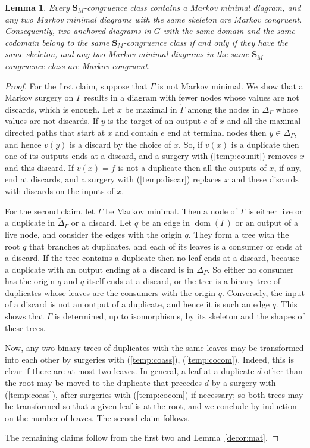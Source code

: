 \documentclass[12pt]{amsart}
\theoremstyle{plain}
\newtheorem{lem}[thm]{Lemma}
\theoremstyle{definition}
\theoremstyle{remark}
\numberwithin{equation}{section}
\theoremstyle{plain}
\DeclareMathOperator{\dom}{dom}
\newcommand{\0}{\emptyset}
\begin{document}
\begin{lem}\label{mar:min:com}
Every $\bm S_M$-congruence class contains a Markov minimal diagram, and any two Markov minimal diagrams with the same skeleton are Markov congruent. Consequently, two anchored diagrams in $G$ with the same domain and the same codomain belong to the same $\bm S_M$-congruence class if and only if they have the same skeleton, and any two Markov minimal diagrams in the same $\bm S_M$-congruence class are Markov congruent.
\end{lem}
\begin{proof}
For the first claim, suppose that $\Gamma$ is not Markov minimal. We show that a Markov surgery on $\Gamma$ results in a diagram with fewer nodes whose values are not discards, which is enough. Let $x$ be maximal in $\dot \Gamma$ among the nodes in $\Delta_\Gamma$ whose values are not discards. If $y$ is the target of an output $e$ of $x$ and all the maximal directed paths that start at $x$ and contain $e$ end at terminal nodes then $y \in \Delta_\Gamma$, and hence $v(y)$ is a discard by the choice of $x$. So, if $v(x)$ is a duplicate then one of its outputs ends at a discard, and a surgery with (\ref{temp:counit}) removes $x$ and this discard. If $v(x) = f$ is not a duplicate then all the outputs of $x$, if any, end at discards, and a surgery with (\ref{temp:discar}) replaces $x$ and these discards with discards on the inputs of $x$.

For the second claim, let $\Gamma$ be Markov minimal. Then a node of $\Gamma$ is either live or a duplicate in $\tilde \Delta_\Gamma$ or a discard. Let $q$ be an edge in $\dom(\Gamma)$ or an output of a live node, and consider the edges with the origin $q$. They form a tree with the root $q$ that branches at duplicates, and each of its leaves is a consumer or ends at a discard. If the tree contains a duplicate then no leaf ends at a discard, because a duplicate with an output ending at a discard is in $\Delta_\Gamma$. So either no consumer has the origin $q$ and $q$ itself ends at a discard, or the tree is a binary tree of duplicates whose leaves are the consumers with the origin $q$. Conversely, the input of a discard is not an output of a duplicate, and hence it is such an edge $q$. This shows that $\Gamma$ is determined, up to isomorphisms, by its skeleton and the shapes of these trees.

Now, any two binary trees of duplicates with the same leaves may be transformed into each other by surgeries with (\ref{temp:coass}), (\ref{temp:cocom}). Indeed, this is clear if there are at most two leaves. In general, a leaf at a duplicate $d$ other than the root may be moved to the duplicate that precedes $d$ by a surgery with (\ref{temp:coass}), after surgeries with (\ref{temp:cocom}) if necessary; so both trees may be transformed so that a given leaf is at the root, and we conclude by induction on the number of leaves. The second claim follows.

The remaining claims follow from the first two and Lemma~\ref{decor:mat}.
\end{proof}
\end{document}
